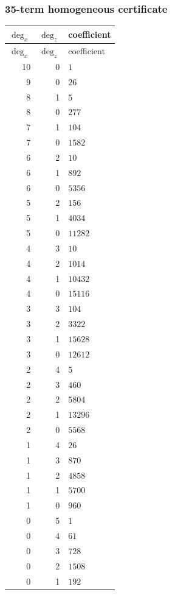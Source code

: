 \subsubsection*{35-term homogeneous certificate}
\begin{longtable}{rrl}
$\deg_{x}$ & $\deg_{z}$ & coefficient\\
\toprule
\endfirsthead
$\deg_{x}$ & $\deg_{z}$ & coefficient\\
\toprule
\endhead
10 & 0 & $1$\\
9 & 0 & $26$\\
8 & 1 & $5$\\
8 & 0 & $277$\\
7 & 1 & $104$\\
7 & 0 & $1582$\\
6 & 2 & $10$\\
6 & 1 & $892$\\
6 & 0 & $5356$\\
5 & 2 & $156$\\
5 & 1 & $4034$\\
5 & 0 & $11282$\\
4 & 3 & $10$\\
4 & 2 & $1014$\\
4 & 1 & $10432$\\
4 & 0 & $15116$\\
3 & 3 & $104$\\
3 & 2 & $3322$\\
3 & 1 & $15628$\\
3 & 0 & $12612$\\
2 & 4 & $5$\\
2 & 3 & $460$\\
2 & 2 & $5804$\\
2 & 1 & $13296$\\
2 & 0 & $5568$\\
1 & 4 & $26$\\
1 & 3 & $870$\\
1 & 2 & $4858$\\
1 & 1 & $5700$\\
1 & 0 & $960$\\
0 & 5 & $1$\\
0 & 4 & $61$\\
0 & 3 & $728$\\
0 & 2 & $1508$\\
0 & 1 & $192$\\
\bottomrule
\end{longtable}


